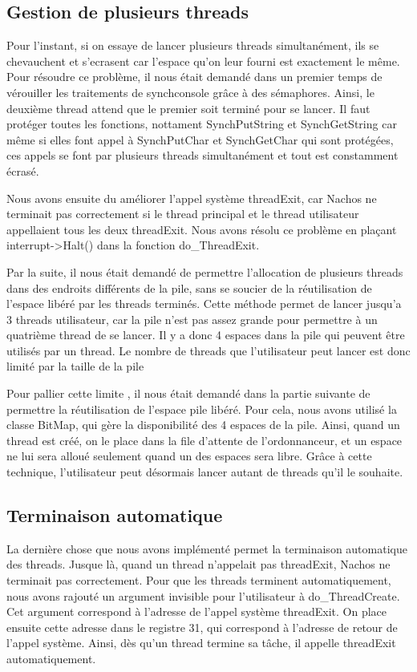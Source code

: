 \documentclass[12pt]{article}
\begin{document}
\subsection{Gestion de plusieurs threads}
Pour l'instant, si on essaye de lancer plusieurs threads simultanément, ils se chevauchent et s'ecrasent car l'espace qu'on leur fourni est exactement le même.
Pour résoudre ce problème, il nous était demandé dans un premier temps de vérouiller les traitements de synchconsole grâce à des sémaphores. Ainsi, le deuxième thread attend que le premier soit terminé pour se lancer. Il faut protéger toutes les fonctions, nottament SynchPutString et SynchGetString car même si elles font appel à SynchPutChar et SynchGetChar qui sont protégées, ces appels se font par plusieurs threads simultanément et tout est constamment écrasé.

Nous avons ensuite du améliorer l'appel système threadExit, car Nachos ne terminait pas correctement si le thread principal et le thread utilisateur appellaient tous les deux threadExit. Nous avons
résolu ce problème en plaçant interrupt->Halt() dans la fonction do\_ThreadExit.

Par la suite, il nous était demandé de permettre l'allocation de plusieurs threads dans des endroits différents de la pile, sans se soucier de la réutilisation de l'espace libéré par les threads terminés.
Cette méthode permet de lancer jusqu'a 3 threads utilisateur, car la pile n'est pas assez grande pour permettre à un quatrième thread de se lancer. Il y a donc 4 espaces dans la pile qui peuvent être utilisés par un thread.
Le nombre de threads que l'utilisateur peut lancer est donc limité
par la taille de la pile

Pour pallier cette limite , il nous était demandé dans la partie suivante de permettre la réutilisation de l'espace pile libéré.
Pour cela, nous avons utilisé la classe BitMap, qui gère la disponibilité des 4 espaces de la pile. Ainsi, quand un thread est créé, on le place dans la file d'attente de l'ordonnanceur, et un espace ne lui sera alloué seulement quand un des espaces sera libre.
Grâce à cette technique, l'utilisateur peut désormais lancer autant
de threads qu'il le souhaite.

\subsection{Terminaison automatique}
La dernière chose que nous avons implémenté permet la terminaison automatique des threads. Jusque là, quand un thread n'appelait pas threadExit, Nachos ne terminait pas correctement.
Pour que les threads terminent automatiquement, nous avons rajouté un argument invisible pour l'utilisateur à do\_ThreadCreate. Cet argument correspond à l'adresse de l'appel système threadExit.
On place ensuite cette adresse dans le registre 31, qui correspond à l'adresse de retour de l'appel système. Ainsi, dès qu'un thread termine sa tâche, il appelle threadExit automatiquement.
\end{document}
